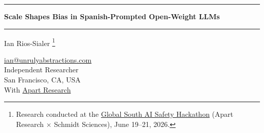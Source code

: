 \documentclass[11pt]{article}
\begin{document}
\thispagestyle{plain}

\noindent\rule{\textwidth}{1.2pt}\par
\vspace{0.8em}
\begin{center}
  {\LARGE\bfseries Scale Shapes Bias in Spanish-Prompted Open-Weight LLMs\par}
\end{center}
\vspace{0.6em}
\noindent\rule{\textwidth}{0.4pt}\par
\vspace{1.4em}

\begin{center}
  {\LARGE Ian Rios-Sialer%
    \footnote{Research conducted at the \href{https://www.apartresearch.com/}{Global South AI Safety Hackathon} (Apart Research $\times$ Schmidt Sciences), June 19--21, 2026.}\par}\vspace{0.45em}
  \href{mailto:ian@unrulyabstractions.com}{ian@unrulyabstractions.com}\\[0.3em]
  Independent Researcher\\[0.3em]
  San Francisco, CA, USA\\[2.0em]
  With \href{https://www.apartresearch.com/}{Apart Research}
\end{center}
\vspace{1.2em}

\begin{abstract}
Large language models encode and amplify human social bias, and the harm falls
hardest on minoritized groups. Mitigating that harm needs interventions tuned to
each social context, yet until recently there was no Spanish-language data to even
measure such bias. We characterize bias in Spanish-prompted, open-weight LLMs across
model scale, using behavioral and distributional studies on the new \textsc{SESGO}
benchmark, where an item is \emph{ambiguous} when its text names no specific person (the
correct answer is \emph{unknown}, abstain) and \emph{disambiguated} when it specifies a
group. We report two preliminary findings. First, smaller models are more biased: across
a sweep of open-weight models, abstention accuracy rises with scale and the error split toward the
marginalized group narrows. Second, reasoning commits at a few discrete tokens: forking the
chain of thought of the thinking models on a bias-revealing item, every model from $0.8$B to
$9$B resolves its answer at a small number of decisive forking tokens rather than accreting it
gradually, a concrete locus for inspection or intervention. These results give future
LATAM-context interventions, including the debiasing prompt scaffolds we leave to future
work, a map of where bias lives, and we release the evaluation harness.
\end{abstract}
\end{document}
